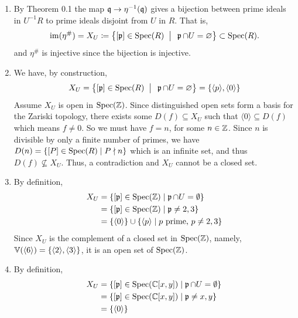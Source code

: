 \documentclass[Notebook.tex]{subfiles}
\begin{document}
\begin{solution}
    \bbni
    \begin{enumerate}
        \item By Theorem 0.1 the map $\operatorname{\mathfrak{q}} \to \eta^{-1}(\operatorname{\mathfrak{q}})$ gives a bijection between prime ideals in $U^{-1}R$ to prime ideals disjoint from $U$ in $R$. That is, 
        \[
        \operatorname{im}(\eta^{\#}) = X_{U} \coloneqq \left\{[\operatorname{\mathfrak{p}}] \in \operatorname{Spec}(R) \;\; \big| \;\; \operatorname{\mathfrak{p}} \cap U = \varnothing\right\} \subset \operatorname{Spec}(R).
        \]
        and $\eta^{\#}$ is injective since the bijection is injective. 

        \item We have, by construction, 
         \[
        X_{U} = \left\{[\operatorname{\mathfrak{p}}] \in \operatorname{Spec}(R) \;\; \big| \;\; \operatorname{\mathfrak{p}} \cap U = \varnothing\right\} = \{\langle p \rangle, \langle 0 \rangle\}
        \]
        Assume $X_U$ is open in $\operatorname{Spec}(\mathbb Z)$. Since distinguished open sets form a basis for the Zariski topology, there exists some $D(f) \subseteq X_U$ such that $\langle 0 \rangle \subseteq D(f)$ which means $ f \neq 0$. So we must have $f = n$, for some $n \in \mathbb Z$. Since $n$ is divisible by only a finite number of primes, we have $D(n) = \{[P] \in \operatorname{Spec}(R) \mid P \nmid n \}$ which is an infinite set, and thus $D(f) \not \subseteq X_U$. Thus, a contradiction and $X_U$ cannot be a closed set. 

        \item By definition, 
        \begin{align*}
            X_U &= \{[\operatorname{\mathfrak{p}}] \in \operatorname{Spec}(\mathbb Z) \mid \operatorname{\mathfrak{p}} \cap U = \emptyset\} \\ 
            &= \{[\operatorname{\mathfrak{p}}] \in \operatorname{Spec}(\mathbb Z) \mid \operatorname{\mathfrak{p}} \neq 2, 3\} \\
            &= \{\langle 0\rangle\} \cup \{\langle p \rangle \; | \; \text{$p$ prime,  $p\neq2,3$}\} 
        \end{align*}
        Since $X_U$ is the complement of a closed set in $\operatorname{Spec}(\mathbb Z)$, namely, 
        $\mathbb V(\langle 6 \rangle) = \{\langle 2 \rangle, \langle 3 \rangle\}$, it is an open set of $\operatorname{Spec}(\mathbb Z)$. 

        \item By definition, 
        \begin{align*}
            X_U &= \{[\operatorname{\mathfrak{p}}] \in \operatorname{Spec}(\mathbb C[x,y]) \mid \operatorname{\mathfrak{p}} \cap U = \emptyset\} \\ 
            &= \{[\operatorname{\mathfrak{p}}] \in \operatorname{Spec}(\mathbb C[x,y]) \mid \operatorname{\mathfrak{p}} \neq x, y\} \\
            &= \{\langle 0\rangle\}
        \end{align*}


\end{enumerate}
\end{solution}
\end{document}
